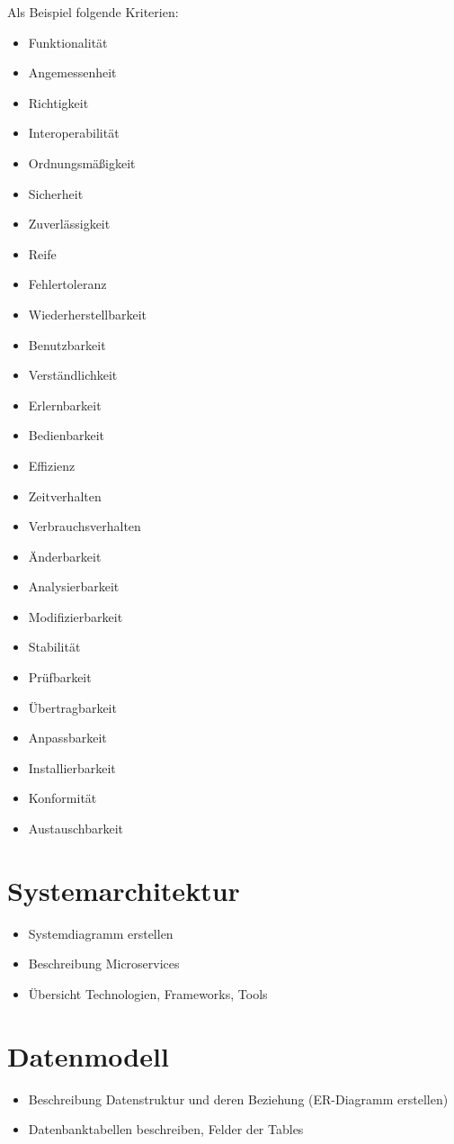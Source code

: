 \documentclass[%
	12pt,
	a4paper,
	oneside,
	parskip=full
]{scrbook}
\begin{document}
Als Beispiel folgende Kriterien:

\begin{itemize}
	\item Funktionalität
	\item Angemessenheit
	\item Richtigkeit
	\item Interoperabilität
	\item Ordnungsmäßigkeit
	\item Sicherheit
	\item Zuverlässigkeit
	\item Reife
	\item Fehlertoleranz
	\item Wiederherstellbarkeit
	\item Benutzbarkeit
	\item Verständlichkeit
	\item Erlernbarkeit
	\item Bedienbarkeit
	\item Effizienz
	\item Zeitverhalten
	\item Verbrauchsverhalten
	\item Änderbarkeit
	\item Analysierbarkeit
	\item Modifizierbarkeit
	\item Stabilität
	\item Prüfbarkeit
	\item Übertragbarkeit
	\item Anpassbarkeit
	\item Installierbarkeit
	\item Konformität
	\item Austauschbarkeit
\end{itemize}

\chapter{Systemarchitektur}
\begin{itemize}
	\item Systemdiagramm erstellen
	\item Beschreibung Microservices
	\item Übersicht Technologien, Frameworks, Tools
\end{itemize}

\chapter{Datenmodell}
\begin{itemize}
	\item Beschreibung Datenstruktur und deren Beziehung (ER-Diagramm erstellen)
	\item Datenbanktabellen beschreiben, Felder der Tables
\end{itemize}
\end{document}
